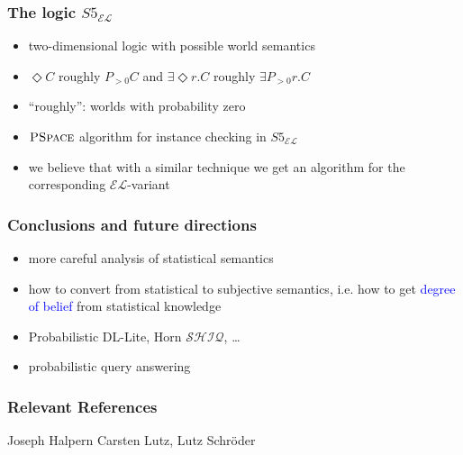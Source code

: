 \documentclass{beamer}
\newcommand{\el}{\ensuremath{\mathcal{EL}}\xspace}
\newcommand{\pspace}{\ensuremath{\textsc{PSpace}}\xspace}
\renewcommand{\emph}[1]{\textcolor{blue}{#1}}
\begin{document}
\begin{frame}
  \frametitle{The logic $S5_{\el}$}
  \begin{itemize}
    \item two-dimensional logic with possible world semantics
    \item $\Diamond C$ roughly $P_{>0}C$ and $\exists\Diamond r.C$ roughly $\exists P_{>0}r.C$
    \item ``roughly'': worlds with probability zero
    \item \pspace algorithm for instance checking in $S5_{\el}$
    \item we believe that with a similar technique we get an algorithm for the corresponding \el-variant
  \end{itemize}
\end{frame}

\begin{frame}
  \frametitle{Conclusions and future directions}
  \begin{itemize}
    \item more careful analysis of statistical semantics
    \item how to convert from statistical to subjective semantics, \mbox{i.e.} how to get \emph{degree of belief} from statistical knowledge
    \item Probabilistic DL-Lite, Horn $\mathcal{SHIQ}$, \dots
    \item probabilistic query answering 
  \end{itemize}
\end{frame}


\begin{frame}
  \frametitle{Relevant References}
  \begin{scriptsize}
    \begin{thebibliography}{xxxxxxxxxxxxxxxxxxxxxxxxxx}
	Joseph Halpern
	Carsten Lutz, Lutz Schr\"oder
    \end{thebibliography}
  \end{scriptsize}
\end{frame}
\end{document}
